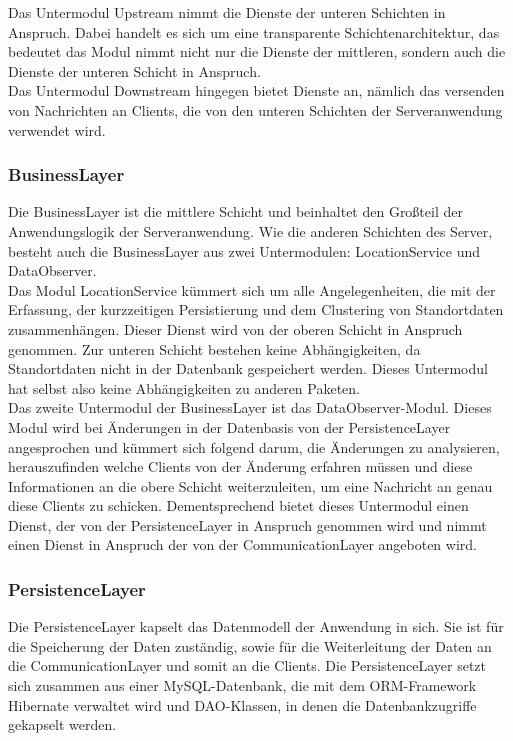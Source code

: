 \documentclass[11pt,a4paper]{article}
\begin{document}
Das Untermodul Upstream nimmt die Dienste der unteren Schichten in Anspruch. Dabei handelt es sich um eine transparente Schichtenarchitektur, das bedeutet das Modul nimmt nicht nur die Dienste der mittleren, sondern auch die Dienste der unteren Schicht in Anspruch.\\

Das Untermodul Downstream hingegen bietet Dienste an, nämlich das versenden von Nachrichten an Clients, die von den unteren Schichten der Serveranwendung verwendet wird.\\

\subsubsection{BusinessLayer}
Die BusinessLayer ist die mittlere Schicht und beinhaltet den Großteil der Anwendungslogik der Serveranwendung. Wie die anderen Schichten des Server, besteht auch die BusinessLayer aus zwei Untermodulen: LocationService und DataObserver.\\

Das Modul LocationService kümmert sich um alle Angelegenheiten, die mit der Erfassung, der kurzzeitigen Persistierung und dem Clustering von Standortdaten zusammenhängen. Dieser Dienst wird von der oberen Schicht in Anspruch genommen. Zur unteren Schicht bestehen keine Abhängigkeiten, da Standortdaten nicht in der Datenbank gespeichert werden. Dieses Untermodul hat selbst also keine Abhängigkeiten zu anderen Paketen.\\

Das zweite Untermodul der BusinessLayer ist das DataObserver-Modul. Dieses Modul wird bei Änderungen in der Datenbasis von der PersistenceLayer angesprochen und kümmert sich folgend darum, die Änderungen zu analysieren, herauszufinden welche Clients von der Änderung erfahren müssen und diese Informationen an die obere Schicht weiterzuleiten, um eine Nachricht an genau diese Clients zu schicken. Dementsprechend bietet dieses Untermodul einen Dienst, der von der PersistenceLayer in Anspruch genommen wird und nimmt einen Dienst in Anspruch der von der CommunicationLayer angeboten wird.\\

\subsubsection{PersistenceLayer}
Die PersistenceLayer kapselt das Datenmodell der Anwendung in sich. Sie ist für die Speicherung der Daten zuständig, sowie für die Weiterleitung der Daten an die CommunicationLayer und somit an die Clients. Die PersistenceLayer setzt sich zusammen aus einer MySQL-Datenbank, die mit dem ORM-Framework Hibernate verwaltet wird und DAO-Klassen, in denen die Datenbankzugriffe gekapselt werden.\\
\end{document}
